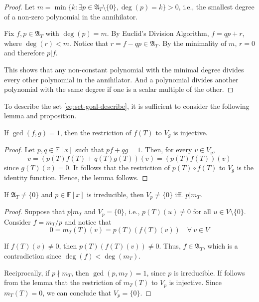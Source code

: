 \begin{proof}
	Let $m = \min \{ k : \exists p \in \mathfrak{A}_T \setminus \{ 0 \}, \deg(p) = k \} > 0$, i.e., the smallest degree of a non-zero polynomial in the annihilator.
	
	Fix $f, p \in \mathfrak{A}_T$ with $\deg(p) = m$. By Euclid's Division Algorithm, $f = qp + r$, where $\deg(r) < m$. Notice that $r = f - qp \in \mathfrak{A}_T$. By the minimality of $m$, $r = 0$ and therefore $p | f$.
	
	This shows that any non-constant polynomial with the minimal degree divides every other polynomial in the annihilator. And a polynomial divides another polynomial with the same degree if one is a scalar multiple of the other.
\end{proof} 

To describe the set \eqref{eq:set-goal-describe}, it is sufficient to consider the following lemma and proposition.

\begin{lemma}\label{lemma:gcd-restriction}
	If $\gcd(f,g) = 1$, then the restriction of $f(T)$ to $V_g$ is injective.
\end{lemma}

\begin{proof}
	Let $p, q \in \mathbb{F}[x]$ such that $pf + qg = 1$. Then, for every $v \in V_g$,
	\[
		v = (p(T)f(T) + q(T) g(T))(v) = (p(T)f(T))(v)
	\]
	since $g(T)(v) = 0$. It follows that the restriction of $p(T) \circ f(T)$ to $V_g$ is the identity function. Hence, the lemma follows.
\end{proof}

\begin{proposition}
	If $\mathfrak{A}_T \neq \{ 0 \}$ and $p \in \mathbb{F}[x]$ is irreducible, then $V_p \neq \{ 0 \}$ iff. $p | m_T$.
\end{proposition}

\begin{proof}
	Suppose that $p | m_T$ and $V_p = \{ 0 \}$, i.e., $p(T)(u) \neq 0$ for all $u \in V \setminus \{ 0 \}$. Consider $f = m_T / p$ and notice that
	\[
		0 = m_T(T)(v) = p(T)(f(T)(v)) \quad \forall~v \in V
	\]
	
	If $f(T)(v) \neq 0$, then $p(T)(f(T)(v)) \neq 0$. Thus, $f \in \mathfrak{A}_T$, which is a contradiction since $\deg(f) < \deg(m_T)$.
	
	Reciprocally, if $p \nmid m_T$, then $\gcd(p, m_T) = 1$, since $p$ is irreducible. If follows from the lemma that the restriction of $m_T(T)$ to $V_p$ is injective. Since $m_T(T) = 0$, we can conclude that $V_p = \{ 0 \}$. 
\end{proof}


